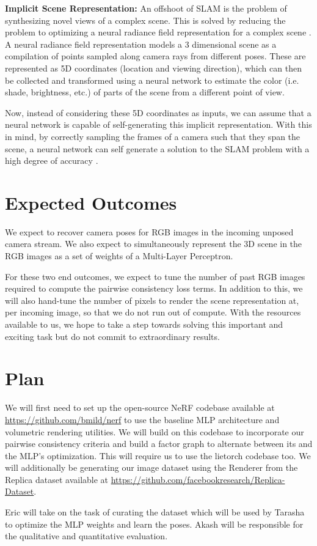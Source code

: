 \documentclass[15pt,letterpaper]{article}
\begin{document}
{\bf Implicit Scene Representation:}
An offshoot of SLAM is the problem of synthesizing novel views of a complex scene. This is solved by reducing the problem to optimizing a neural radiance field representation for a complex scene \cite{nerf}. A neural radiance field representation models a 3 dimensional scene as a compilation of points sampled along camera rays from different poses. These are represented as 5D coordinates (location and viewing direction), which can then be collected and transformed using a neural network to estimate the color (i.e. shade, brightness, etc.) of parts of the scene from a different point of view.

Now, instead of considering these 5D coordinates as inputs, we can assume that a neural network is capable of self-generating this implicit representation. With this in mind, by correctly sampling the frames of a camera such that they span the scene, a neural network can self generate a solution to the SLAM problem with a high degree of accuracy \cite{imap}.

\section{Expected Outcomes}%
\label{sec:Expected Outcomes}
We expect to recover camera poses for RGB images in the incoming unposed camera stream. We also expect to simultaneously represent the 3D scene in the RGB images as a set of weights of a Multi-Layer Perceptron.

For these two end outcomes, we expect to tune the number of past RGB images required to compute the pairwise consistency loss terms. In addition to this, we will also hand-tune the number of pixels to render the scene representation at, per incoming image, so that we do not run out of compute. With the resources available to us, we hope to take a step towards solving this important and exciting task but do not commit to extraordinary results.
\section{Plan}%
\label{sec:Plan}

We will first need to set up the open-source NeRF codebase available at \hyperlink{https://github.com/bmild/nerf}{https://github.com/bmild/nerf} to use the baseline MLP architecture and volumetric rendering utilities. We will build on this codebase to incorporate our pairwise consistency criteria and build a factor graph to alternate between its and the MLP's optimization. This will require us to use the lietorch codebase too. We will additionally be generating our image dataset using the Renderer from the Replica dataset available at \hyperlink{https://github.com/facebookresearch/Replica-Dataset}{https://github.com/facebookresearch/Replica-Dataset}. 

Eric will take on the task of curating the dataset which will be used by Tarasha to optimize the MLP weights and learn the poses. Akash will be responsible for the qualitative and quantitative evaluation.



\end{document}
